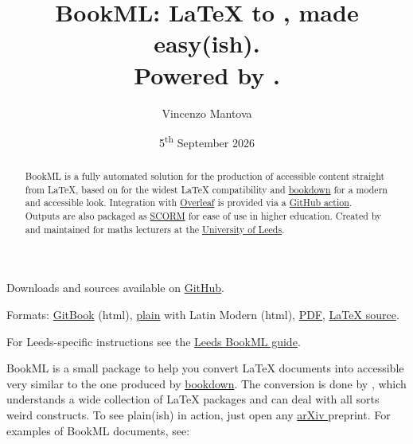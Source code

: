\documentclass[a4paper,british]{article}
\title{\texorpdfstring{BookML\@: \LaTeX{} to \HTML, made easy(ish). \\ Powered by \href{https://dlmf.nist.gov/LaTeXML/}{\LaTeXML}.}{BookML: LaTeX to HTML, made easy(ish). Powered by LaTeXML.}}
\author{Vincenzo Mantova}
\date{5\textsuperscript{th} September 2026}
\begin{document}
\maketitle

\begin{abstract}
  BookML is a fully automated solution for the production of accessible \HTML{} content straight from \LaTeX{}, based on \href{https://dlmf.nist.gov/LaTeXML/}{\LaTeXML} for the widest \LaTeX{} compatibility and \href{https://bookdown.org/home/}{bookdown} for a modern and accessible look. Integration with \href{https://www.overleaf.com/}{Overleaf} is provided via a \href{https://github.com/marketplace/actions/compile-with-bookml}{GitHub action}. Outputs are also packaged as \href{https://scorm.com/}{SCORM} for ease of use in higher education. Created by and maintained for maths lecturers at the \href{https://eps.leeds.ac.uk/maths}{University of Leeds}.
\end{abstract}

\begin{center}
  Downloads and sources available on \href{https://github.com/vlmantova/bookml/}{GitHub}.

  Formats: \href{https://vlmantova.github.io/bookml/}{GitBook} (html), \href{plain/}{plain} with Latin Modern (html), \href{https://vlmantova.github.io/bookml/docs.pdf}{PDF}, \href{https://github.com/vlmantova/bookml/blob/docs/docs.tex}{\LaTeX{} source}.

  For Leeds-specific instructions see the \href{https://vlmantova.github.io/bookmlleeds/}{Leeds BookML guide}.
\end{center}

BookML is a small package to help you convert \LaTeX{} documents into accessible \HTML{} very similar to the one produced by \href{https://bookdown.org/home/}{bookdown}. The conversion is done by \href{https://dlmf.nist.gov/LaTeXML/}{\LaTeXML{}}, which understands a wide collection of \LaTeX{} packages and can deal with all sorts weird constructs. To see plain(ish) \LaTeXML{} in action, just open any \href{https://info.arxiv.org/about/accessible_HTML.html}{arXiv \HTML} preprint. For examples of BookML documents, see:
\end{document}
